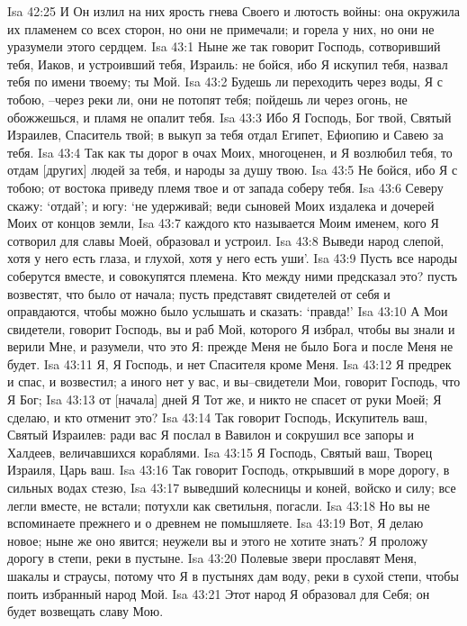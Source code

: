 Isa 42:25  И Он излил на них ярость гнева Своего и лютость войны: она окружила их пламенем со всех сторон, но они не примечали; и горела у них, но они не уразумели этого сердцем.
Isa 43:1  Ныне же так говорит Господь, сотворивший тебя, Иаков, и устроивший тебя, Израиль: не бойся, ибо Я искупил тебя, назвал тебя по имени твоему; ты Мой.
Isa 43:2  Будешь ли переходить через воды, Я с тобою, --через реки ли, они не потопят тебя; пойдешь ли через огонь, не обожжешься, и пламя не опалит тебя.
Isa 43:3  Ибо Я Господь, Бог твой, Святый Израилев, Спаситель твой; в выкуп за тебя отдал Египет, Ефиопию и Савею за тебя.
Isa 43:4  Так как ты дорог в очах Моих, многоценен, и Я возлюбил тебя, то отдам [других] людей за тебя, и народы за душу твою.
Isa 43:5  Не бойся, ибо Я с тобою; от востока приведу племя твое и от запада соберу тебя.
Isa 43:6  Северу скажу: `отдай'; и югу: `не удерживай; веди сыновей Моих издалека и дочерей Моих от концов земли,
Isa 43:7  каждого кто называется Моим именем, кого Я сотворил для славы Моей, образовал и устроил.
Isa 43:8  Выведи народ слепой, хотя у него есть глаза, и глухой, хотя у него есть уши'.
Isa 43:9  Пусть все народы соберутся вместе, и совокупятся племена. Кто между ними предсказал это? пусть возвестят, что было от начала; пусть представят свидетелей от себя и оправдаются, чтобы можно было услышать и сказать: `правда!'
Isa 43:10  А Мои свидетели, говорит Господь, вы и раб Мой, которого Я избрал, чтобы вы знали и верили Мне, и разумели, что это Я: прежде Меня не было Бога и после Меня не будет.
Isa 43:11  Я, Я Господь, и нет Спасителя кроме Меня.
Isa 43:12  Я предрек и спас, и возвестил; а иного нет у вас, и вы--свидетели Мои, говорит Господь, что Я Бог;
Isa 43:13  от [начала] дней Я Тот же, и никто не спасет от руки Моей; Я сделаю, и кто отменит это?
Isa 43:14  Так говорит Господь, Искупитель ваш, Святый Израилев: ради вас Я послал в Вавилон и сокрушил все запоры и Халдеев, величавшихся кораблями.
Isa 43:15  Я Господь, Святый ваш, Творец Израиля, Царь ваш.
Isa 43:16  Так говорит Господь, открывший в море дорогу, в сильных водах стезю,
Isa 43:17  выведший колесницы и коней, войско и силу; все легли вместе, не встали; потухли как светильня, погасли.
Isa 43:18  Но вы не вспоминаете прежнего и о древнем не помышляете.
Isa 43:19  Вот, Я делаю новое; ныне же оно явится; неужели вы и этого не хотите знать? Я проложу дорогу в степи, реки в пустыне.
Isa 43:20  Полевые звери прославят Меня, шакалы и страусы, потому что Я в пустынях дам воду, реки в сухой степи, чтобы поить избранный народ Мой.
Isa 43:21  Этот народ Я образовал для Себя; он будет возвещать славу Мою.
